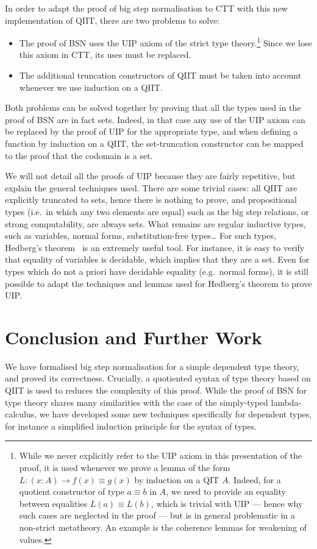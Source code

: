 \documentclass[a4paper,english]{lipics-v2019}
\begin{document}
In order to adapt the proof of big step normalisation to CTT with this new
implementation of QIIT, there are two problems to solve:
\begin{itemize}
\item The proof of BSN uses the UIP axiom of the strict type theory.\footnote{%
    While we never explicitly refer to the UIP axiom in this presentation of the
    proof, it is used whenever we prove a lemma of the form
    $L : (x : A) \to f(x) \equiv g(x)$ by induction on a QIT $A$.
    Indeed, for a quotient constructor of type $a \equiv b$ in $A$, we need to
    provide an equality between equalities $L(a) \equiv L(b)$, which is trivial
    with UIP --- hence why such cases are neglected in the proof --- but is
    in general problematic in a non-strict metatheory.
    An example is the coherence lemmas for weakening of values.
  }
  Since we lose this axiom in CTT, its uses must be replaced.
\item The additional truncation constructors of QIIT must be taken into account
  whenever we use induction on a QIIT.
\end{itemize}
Both problems can be solved together by proving that all the types used in the
proof of BSN are in fact sets. Indeed, in that case any use of the UIP axiom
can be replaced by the proof of UIP for the appropriate type, and when defining
a function by induction on a QIIT, the set-truncation constructor can be mapped
to the proof that the codomain is a set.

We will not detail all the proofs of UIP because they are fairly repetitive, but
explain the general techniques used. There are some trivial cases: all QIIT are
explicitly truncated to sets, hence there is nothing to prove, and propositional
types (i.e.\ in which any two elements are equal) such as the big step
relations, or strong computability, are always sets. What remains are regular
inductive types, such as variables, normal forms, substitution-free types\dots{}
For such types, Hedberg's theorem~\cite{hedberg1998coherence} is an extremely
useful tool. For instance, it is easy to verify that equality of variables is
decidable, which implies that they are a set. Even for types which do not a
priori have decidable equality (e.g.\ normal forms), it is still possible to
adapt the techniques and lemmas used for Hedberg's theorem to prove UIP.

\section{Conclusion and Further Work}
We have formalised big step normalisation for a simple dependent type theory,
and proved its correctness. Crucially, a quotiented syntax of type theory based
on QIIT is used to reduces the complexity of this proof. While the proof of BSN
for type theory shares many similarities with the case of the simply-typed
lambda-calculus, we have developed some new techniques specifically for
dependent types, for instance a simplified induction principle for the syntax
of types.
\end{document}
